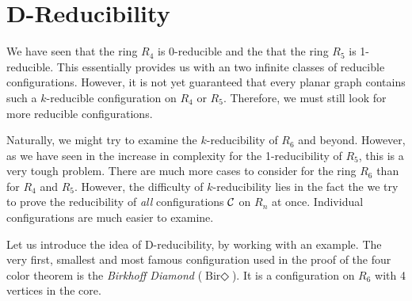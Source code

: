 \section{D-Reducibility}
\label{sec:dreduce}

We have seen that the ring $R_4$ is 0-reducible and the that the ring $R_5$ is 1-reducible. This essentially provides us with an two infinite classes of reducible configurations. However, it is not yet guaranteed that every planar graph contains such a $k$-reducible configuration on $R_4$ or $R_5$. Therefore, we must still look for more reducible configurations.

Naturally, we might try to examine the $k$-reducibility of $R_6$ and beyond. However, as we have seen in the increase in complexity for the 1-reducibility of $R_5$, this is a very tough problem. There are much more cases to consider for the ring $R_6$ than for $R_4$ and $R_5$. However, the difficulty of $k$-reducibility lies in the fact the we try to prove the reducibility of \textit{all} configurations $\mathcal{C}$ on $R_n$ at once. Individual configurations are much easier to examine. 

Let us introduce the idea of D-reducibility, by working with an example. The very first, smallest and most famous configuration used in the proof of the four color theorem is the \textit{Birkhoff Diamond}  ($\text{Bir}\Diamond$). It is a configuration on $R_6$ with 4 vertices in the core.

